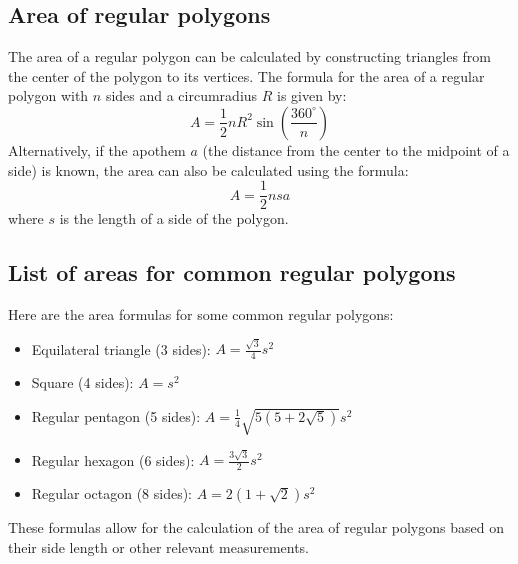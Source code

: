 \subsection{Area of regular polygons}

The area of a regular polygon can be calculated by constructing triangles from the center of the polygon to its vertices. The formula for the area of a regular polygon with \( n \) sides and a circumradius \( R \) is given by:
\[A = \frac{1}{2} n R^2 \sin\left(\frac{360^\circ}{n}\right)\]
Alternatively, if the apothem \( a \) (the distance from the center to the midpoint of a side) is known, the area can also be calculated using the formula:
\[A = \frac{1}{2} n s a\]
where \( s \) is the length of a side of the polygon.

\subsection{List of areas for common regular polygons}
Here are the area formulas for some common regular polygons:
\begin{itemize}
    \item Equilateral triangle (3 sides): \( A = \frac{\sqrt{3}}{4} s^2 \)
    \item Square (4 sides): \( A = s^2 \)
    \item Regular pentagon (5 sides): \( A = \frac{1}{4} \sqrt{5(5 + 2\sqrt{5})} s^2 \)
    \item Regular hexagon (6 sides): \( A = \frac{3\sqrt{3}}{2} s^2 \)
    \item Regular octagon (8 sides): \( A = 2(1 + \sqrt{2}) s^2 \)
\end{itemize}
These formulas allow for the calculation of the area of regular polygons based on their side length or other relevant measurements.